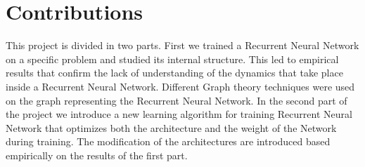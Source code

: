 \section{Contributions}
    This project is divided in two parts. First we trained a Recurrent Neural Network on a specific problem and studied its internal structure. This led to empirical results that confirm the lack of understanding of the dynamics that take place inside a Recurrent Neural Network. Different Graph theory techniques were used on the graph representing the Recurrent Neural Network. In the second part of the project we introduce a new learning algorithm for training Recurrent Neural Network that optimizes both the architecture and the weight of the Network during training. The modification of the architectures are introduced based empirically on the results of the first part. 

